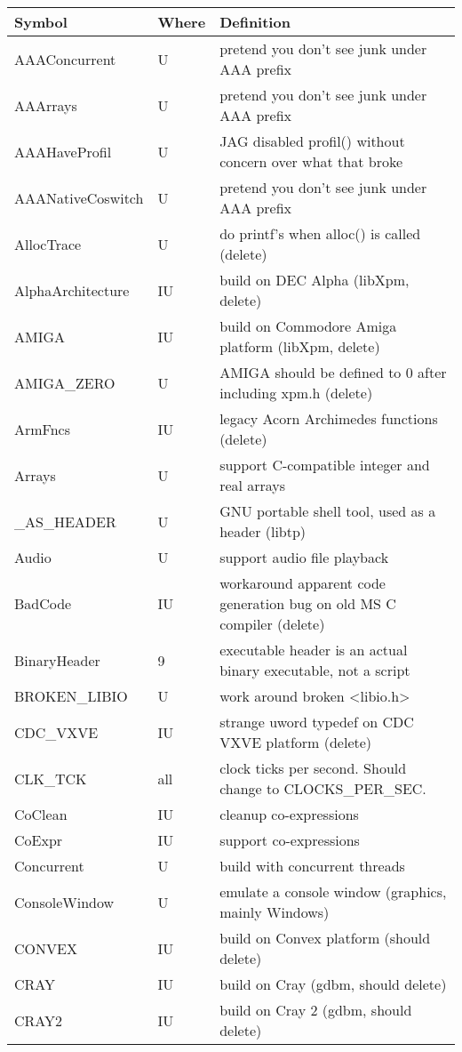 \begin{xtabular}{|m{1.8in}|m{0.5in}|m{4.0in}|}
\hline
Symbol & Where & Definition \\ \hline
AAAConcurrent & U & pretend you don't see junk under AAA prefix \\
AAArrays & U & pretend you don't see junk under AAA prefix \\
AAAHaveProfil & U & JAG disabled profil() without concern over what that broke\\
AAANativeCoswitch & U & pretend you don't see junk under AAA prefix \\
AllocTrace & U & do printf's when alloc() is called (delete) \\
AlphaArchitecture & IU & build on DEC Alpha (libXpm, delete) \\
AMIGA & IU & build on Commodore Amiga platform (libXpm, delete) \\ 
AMIGA\_ZERO & U & AMIGA should be defined to 0 after including xpm.h (delete) \\ 
ArmFncs & IU & legacy Acorn Archimedes functions (delete) \\
Arrays & U & support C-compatible integer and real arrays \\
\_AS\_HEADER & U & GNU portable shell tool, used as a header (libtp) \\
Audio & U & support audio file playback \\
BadCode & IU & workaround apparent code generation bug on old MS C compiler (delete) \\
BinaryHeader & 9 & executable header is an actual binary executable,
		not a script \\
BROKEN\_LIBIO & U & work around broken <libio.h> \\
CDC\_VXVE & IU & strange uword typedef on CDC VXVE platform (delete) \\
CLK\_TCK & all & clock ticks per second. Should change to CLOCKS\_PER\_SEC. \\
CoClean & IU & cleanup co-expressions \\
CoExpr & IU & support co-expressions \\
Concurrent & U & build with concurrent threads \\
ConsoleWindow & U & emulate a console window (graphics, mainly Windows) \\
CONVEX & IU & build on Convex platform (should delete) \\
CRAY & IU & build on Cray (gdbm, should delete) \\
CRAY2 & IU & build on Cray 2 (gdbm, should delete) \\

\end{xtabular}

